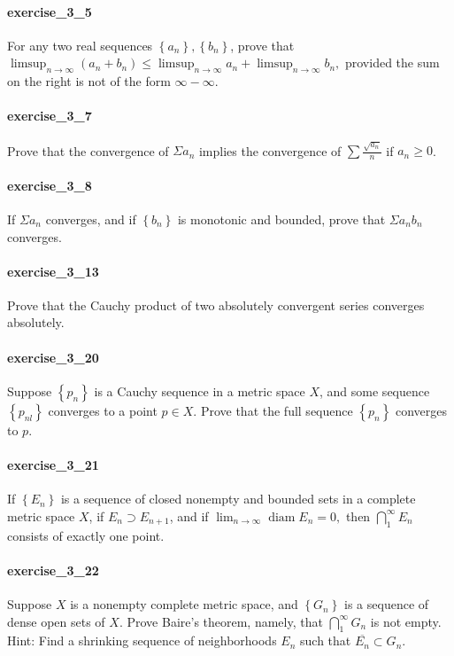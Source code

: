 \documentclass{article}
\begin{document}
\paragraph{exercise\_3\_5} For any two real sequences $\left\{a_{n}\right\},\left\{b_{n}\right\}$, prove that $\limsup _{n \rightarrow \infty}\left(a_{n}+b_{n}\right) \leq \limsup _{n \rightarrow \infty} a_{n}+\limsup _{n \rightarrow \infty} b_{n},$ provided the sum on the right is not of the form $\infty-\infty$.

\paragraph{exercise\_3\_7} Prove that the convergence of $\Sigma a_{n}$ implies the convergence of $\sum \frac{\sqrt{a_{n}}}{n}$ if $a_n\geq 0$.

\paragraph{exercise\_3\_8} If $\Sigma a_{n}$ converges, and if $\left\{b_{n}\right\}$ is monotonic and bounded, prove that $\Sigma a_{n} b_{n}$ converges.

\paragraph{exercise\_3\_13} Prove that the Cauchy product of two absolutely convergent series converges absolutely.

\paragraph{exercise\_3\_20} Suppose $\left\{p_{n}\right\}$ is a Cauchy sequence in a metric space $X$, and some sequence $\left\{p_{n l}\right\}$ converges to a point $p \in X$. Prove that the full sequence $\left\{p_{n}\right\}$ converges to $p$.

\paragraph{exercise\_3\_21} If $\left\{E_{n}\right\}$ is a sequence of closed nonempty and bounded sets in a complete metric space $X$, if $E_{n} \supset E_{n+1}$, and if $\lim _{n \rightarrow \infty} \operatorname{diam} E_{n}=0,$ then $\bigcap_{1}^{\infty} E_{n}$ consists of exactly one point.

\paragraph{exercise\_3\_22} Suppose $X$ is a nonempty complete metric space, and
$\left\{G_{n}\right\}$ is a sequence of dense open sets of $X$. Prove Baire's
theorem, namely, that $\bigcap_{1}^{\infty} G_{n}$ is not empty. Hint: Find a
shrinking sequence of neighborhoods $E_{n}$ such that $\overline{E_{n}} \subset G_{n}$.
\end{document}
